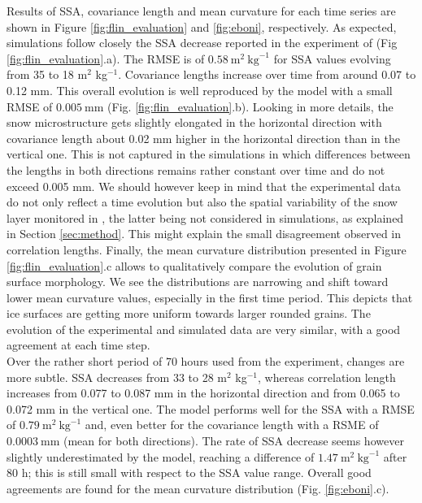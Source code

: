 \documentclass[draft,ms]{agujournal2019}
\begin{document}
Results of SSA, covariance length and mean curvature for each time series are shown in Figure \ref{fig:flin_evaluation} and \ref{fig:eboni}, respectively. As expected, simulations follow closely the SSA decrease reported in the experiment of  (Fig \ref{fig:flin_evaluation}.a).
The RMSE is of $0.58\ \mathrm{m}^2\ \mathrm{kg}^{-1}$ for SSA values evolving from 35 to 18 m$^2$ kg$^{-1}$.
Covariance lengths increase over time from around 0.07 to 0.12 mm. This overall evolution is well reproduced by the model with a small RMSE of $0.005\ \mathrm{mm}$ (Fig. \ref{fig:flin_evaluation}.b). Looking in more details, the snow microstructure gets slightly elongated in the horizontal direction with covariance length about 0.02 mm higher in the horizontal direction than in the vertical one. This is not captured in the simulations in which differences between the lengths in both directions remains rather constant over time and do not exceed 0.005 mm. We should however keep in mind that the experimental data do not only reflect a time evolution but also the spatial variability of the snow layer monitored in , the latter being not considered in simulations, as explained in Section \ref{sec:method}. This might explain the small disagreement observed in correlation lengths.
Finally, the mean curvature distribution presented in Figure \ref{fig:flin_evaluation}.c allows to qualitatively compare the evolution of grain surface morphology. We see the distributions are narrowing and shift toward lower mean curvature values, especially in the first time period. This depicts that ice surfaces are getting more uniform towards larger rounded grains. The evolution of the experimental and simulated data are very similar, with a good agreement at each time step.\\



 Over the rather short period of 70 hours used from the  experiment, changes are more subtle. SSA decreases from 33 to 28 m$^2$ kg$^{-1}$, whereas correlation length increases from 0.077 to 0.087 mm in the horizontal direction and from 0.065 to 0.072 mm in the vertical one. The model performs well for the SSA with a RMSE of $0.79\ \mathrm{m}^2\ \mathrm{kg}^{-1}$ and, even better for the covariance length with a RSME of $0.0003\ \mathrm{mm}$ (mean for both directions).
The rate of SSA decrease seems however slightly underestimated by the model, reaching a difference of $1.47\ \mathrm{m}^2\ \mathrm{kg}^{-1}$ after 80 h; this is still small with respect to the SSA value range.
Overall good agreements are found for the mean curvature distribution (Fig. \ref{fig:eboni}.c). \\
\end{document}
